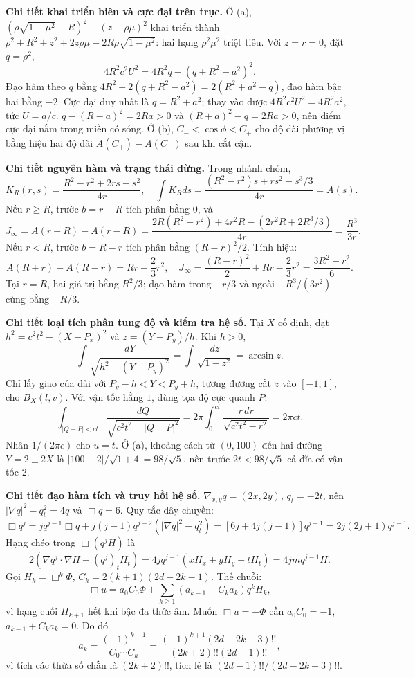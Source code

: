 \textbf{Chi tiết khai triển biên và cực đại trên trục.} Ở (a), $(\rho\sqrt{1-\mu^2}-R)^2+(z+\rho\mu)^2$ khai triển thành $\rho^2+R^2+z^2+2z\rho\mu-2R\rho\sqrt{1-\mu^2}$: hai hạng $\rho^2\mu^2$ triệt tiêu. Với $z=r=0$, đặt $q=\rho^2$,
\[4R^2c^2U^2=4R^2q-(q+R^2-a^2)^2.\]
Đạo hàm theo $q$ bằng $4R^2-2(q+R^2-a^2)=2(R^2+a^2-q)$, đạo hàm bậc hai bằng $-2$. Cực đại duy nhất là $q=R^2+a^2$; thay vào được $4R^2c^2U^2=4R^2a^2$, tức $U=a/c$. $q-(R-a)^2=2Ra>0$ và $(R+a)^2-q=2Ra>0$, nên điểm cực đại nằm trong miền có sóng. Ở (b), $C_-<\cos\phi<C_+$ cho độ dài phương vị bằng hiệu hai độ dài $A(C_+)-A(C_-)$ sau khi cắt cận.

\textbf{Chi tiết nguyên hàm và trạng thái dừng.} Trong nhánh chỏm,
\[K_R(r,s)=\frac{R^2-r^2+2rs-s^2}{4r},\quad
\int K_Rds=\frac{(R^2-r^2)s+rs^2-s^3/3}{4r}=A(s).\]
Nếu $r\ge R$, trước $b=r-R$ tích phân bằng $0$, và
\[J_\infty=A(r+R)-A(r-R)
=\frac{2R(R^2-r^2)+4r^2R-(2r^2R+2R^3/3)}{4r}
=\frac{R^3}{3r}.\]
Nếu $r<R$, trước $b=R-r$ tích phân bằng $(R-r)^2/2$. Tính hiệu:
\[A(R+r)-A(R-r)=Rr-\frac23r^2,\quad
J_\infty=\frac{(R-r)^2}{2}+Rr-\frac23r^2=\frac{3R^2-r^2}{6}.\]
Tại $r=R$, hai giá trị bằng $R^2/3$; đạo hàm trong $-r/3$ và ngoài $-R^3/(3r^2)$ cùng bằng $-R/3$.

\textbf{Chi tiết loại tích phân tung độ và kiểm tra hệ số.} Tại $X$ cố định, đặt $h^2=c^2t^2-(X-P_x)^2$ và $z=(Y-P_y)/h$. Khi $h>0$,
\[\int\frac{dY}{\sqrt{h^2-(Y-P_y)^2}}
=\int\frac{dz}{\sqrt{1-z^2}}=\arcsin z.\]
Chỉ lấy giao của dải với $P_y-h<Y<P_y+h$, tương đương cắt $z$ vào $[-1,1]$, cho $B_X(l,v)$. Với vận tốc hằng $1$, dùng tọa độ cực quanh $P$:
\[\int_{|Q-P|<ct}\frac{dQ}{\sqrt{c^2t^2-|Q-P|^2}}
=2\pi\int_0^{ct}\frac{r\,dr}{\sqrt{c^2t^2-r^2}}
=2\pi ct.\]
Nhân $1/(2\pi c)$ cho $u=t$. Ở (a), khoảng cách từ $(0,100)$ đến hai đường $Y=2\pm2X$ là $|100-2|/\sqrt{1+4}=98/\sqrt5$, nên trước $2t<98/\sqrt5$ cả đĩa có vận tốc $2$.

\textbf{Chi tiết đạo hàm tích và truy hồi hệ số.} $\nabla_{x,y}q=(2x,2y)$, $q_t=-2t$, nên $|\nabla q|^2-q_t^2=4q$ và $\Box q=6$. Quy tắc dây chuyền:
\[\Box q^j=j q^{j-1}\Box q+j(j-1)q^{j-2}(|\nabla q|^2-q_t^2)
=[6j+4j(j-1)]q^{j-1}=2j(2j+1)q^{j-1}.\]
Hạng chéo trong $\Box(q^jH)$ là
\[2(\nabla q^j\cdot\nabla H-(q^j)_tH_t)
=4jq^{j-1}(xH_x+yH_y+tH_t)=4jmq^{j-1}H.\]
Gọi $H_k=\Box^k\Phi$, $C_k=2(k+1)(2d-2k-1)$. Thế chuỗi:
\[\Box u=a_0C_0\Phi+\sum_{k\ge1}(a_{k-1}+C_ka_k)q^kH_k,\]
vì hạng cuối $H_{k+1}$ hết khi bậc đa thức âm. Muốn $\Box u=-\Phi$ cần $a_0C_0=-1$, $a_{k-1}+C_ka_k=0$. Do đó
\[a_k=\frac{(-1)^{k+1}}{C_0\cdots C_k}
=\frac{(-1)^{k+1}(2d-2k-3)!!}{(2k+2)!!(2d-1)!!},\]
vì tích các thừa số chẵn là $(2k+2)!!$, tích lẻ là $(2d-1)!!/(2d-2k-3)!!$.
